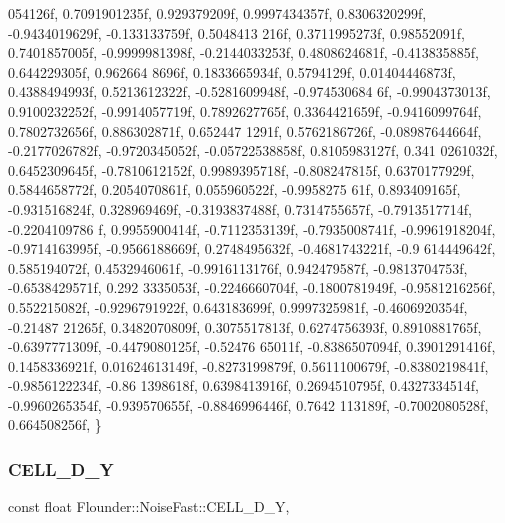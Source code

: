 \begin{DoxyCode}
      054126f, 0.7091901235f, 0.929379209f, 0.9997434357f, 0.8306320299f, -0.9434019629f, -0.133133759f, 0.5048413
      216f, 0.3711995273f, 0.98552091f,
        0.7401857005f, -0.9999981398f, -0.2144033253f, 0.4808624681f, -0.413835885f, 0.644229305f, 0.962664
      8696f, 0.1833665934f, 0.5794129f, 0.01404446873f, 0.4388494993f, 0.5213612322f, -0.5281609948f, -0.974530684
      6f, -0.9904373013f, 0.9100232252f,
        -0.9914057719f, 0.7892627765f, 0.3364421659f, -0.9416099764f, 0.7802732656f, 0.886302871f, 0.652447
      1291f, 0.5762186726f, -0.08987644664f, -0.2177026782f, -0.9720345052f, -0.05722538858f, 0.8105983127f, 0.341
      0261032f, 0.6452309645f, -0.7810612152f,
        0.9989395718f, -0.808247815f, 0.6370177929f, 0.5844658772f, 0.2054070861f, 0.055960522f, -0.9958275
      61f, 0.893409165f, -0.931516824f, 0.328969469f, -0.3193837488f, 0.7314755657f, -0.7913517714f, -0.2204109786
      f, 0.9955900414f, -0.7112353139f,
        -0.7935008741f, -0.9961918204f, -0.9714163995f, -0.9566188669f, 0.2748495632f, -0.4681743221f, -0.9
      614449642f, 0.585194072f, 0.4532946061f, -0.9916113176f, 0.942479587f, -0.9813704753f, -0.6538429571f, 0.292
      3335053f, -0.2246660704f, -0.1800781949f,
        -0.9581216256f, 0.552215082f, -0.9296791922f, 0.643183699f, 0.9997325981f, -0.4606920354f, -0.21487
      21265f, 0.3482070809f, 0.3075517813f, 0.6274756393f, 0.8910881765f, -0.6397771309f, -0.4479080125f, -0.52476
      65011f, -0.8386507094f, 0.3901291416f,
        0.1458336921f, 0.01624613149f, -0.8273199879f, 0.5611100679f, -0.8380219841f, -0.9856122234f, -0.86
      1398618f, 0.6398413916f, 0.2694510795f, 0.4327334514f, -0.9960265354f, -0.939570655f, -0.8846996446f, 0.7642
      113189f, -0.7002080528f, 0.664508256f,
    \}
\end{DoxyCode}
\mbox{\label{class_flounder_1_1_noise_fast_abd468059d826f2901c364cf7305c9d94}} 
\subsubsection{\texorpdfstring{C\+E\+L\+L\+\_\+D\+\_\+Y}{CELL\_2D\_Y}}
{\footnotesize\ttfamily const float Flounder\+::\+Noise\+Fast\+::\+C\+E\+L\+L\+\_\+D\+\_\+Y\hspace{0.3cm}{\ttfamily [static]}, {\ttfamily [private]}}

